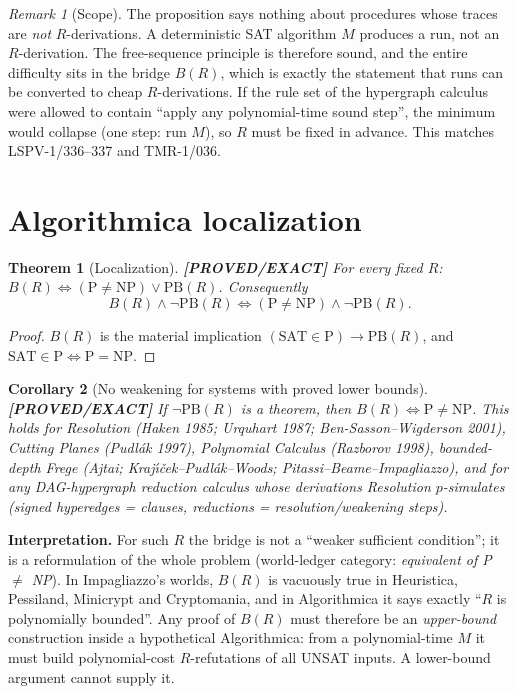 \documentclass[11pt]{article}
\newtheorem{theorem}{Theorem}
\newtheorem{corollary}[theorem]{Corollary}
\theoremstyle{definition}
\theoremstyle{remark}
\newtheorem*{remark}{Remark}
\newcommand{\SAT}{\mathrm{SAT}}
\newcommand{\PB}{\mathrm{PB}}
\newcommand{\status}[1]{\textbf{[#1]}}
\begin{document}
\begin{remark}[Scope]
The proposition says nothing about procedures whose traces are \emph{not} $R$-derivations. A deterministic SAT algorithm $M$
produces a run, not an $R$-derivation. The free-sequence principle is therefore sound, and the entire difficulty sits in the
bridge $B(R)$, which is exactly the statement that runs can be converted to cheap $R$-derivations. If the rule set of the
hypergraph calculus were allowed to contain ``apply any polynomial-time sound step'', the minimum would collapse
(one step: run $M$), so $R$ must be fixed in advance. This matches LSPV-1/336--337 and TMR-1/036.
\end{remark}

\section{Algorithmica localization}
\begin{theorem}[Localization]\label{thm:loc}\status{PROVED/EXACT}
For every fixed $R$: $B(R)\iff (\mathrm{P}\ne\mathrm{NP})\vee \PB(R)$. Consequently
\[
B(R)\wedge\neg\PB(R)\iff (\mathrm{P}\ne\mathrm{NP})\wedge\neg\PB(R).
\]
\end{theorem}
\begin{proof}$B(R)$ is the material implication $(\SAT\in\mathrm P)\to\PB(R)$, and $\SAT\in\mathrm P\iff\mathrm P=\mathrm{NP}$.\end{proof}

\begin{corollary}[No weakening for systems with proved lower bounds]\status{PROVED/EXACT}
If $\neg\PB(R)$ is a theorem, then $B(R)\iff \mathrm P\ne\mathrm{NP}$. This holds for Resolution (Haken 1985; Urquhart 1987;
Ben-Sasson--Wigderson 2001), Cutting Planes (Pudl\'ak 1997), Polynomial Calculus (Razborov 1998), bounded-depth Frege
(Ajtai; Kraj\'{\i}\v{c}ek--Pudl\'ak--Woods; Pitassi--Beame--Impagliazzo), and for any DAG-hypergraph reduction calculus
whose derivations Resolution $p$-simulates (signed hyperedges = clauses, reductions = resolution/weakening steps).
\end{corollary}

\noindent\textbf{Interpretation.} For such $R$ the bridge is not a ``weaker sufficient condition''; it is a reformulation of
the whole problem (world-ledger category: \emph{equivalent of P $\ne$ NP}). In Impagliazzo's worlds, $B(R)$ is vacuously
true in Heuristica, Pessiland, Minicrypt and Cryptomania, and in Algorithmica it says exactly ``$R$ is polynomially bounded''.
Any proof of $B(R)$ must therefore be an \emph{upper-bound} construction inside a hypothetical Algorithmica: from a
polynomial-time $M$ it must build polynomial-cost $R$-refutations of all UNSAT inputs. A lower-bound argument cannot supply it.
\end{document}

